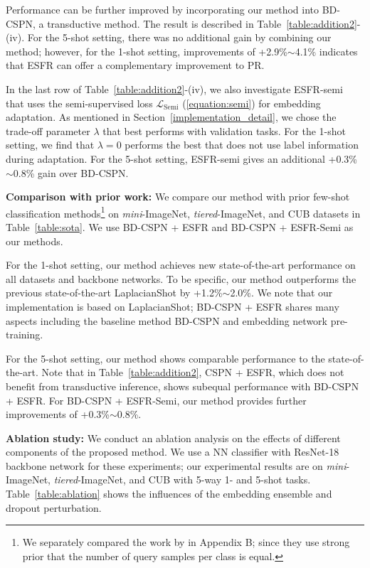 \documentclass{article}
\begin{document}
Performance can be further improved by incorporating our method into BD-CSPN, a transductive method. The result is described in Table~\ref{table:addition2}-(iv). For the 5-shot setting, there was no additional gain by combining our method; however, for the 1-shot setting, improvements of +2.9\%$\sim$4.1\% indicates that ESFR can offer a complementary improvement to PR.

In the last row of Table~\ref{table:addition2}-(iv), we also investigate ESFR-semi that uses the semi-supervised loss $\mathcal{L}_\text{Semi}$ (\ref{equation:semi}) for embedding adaptation. As mentioned in Section~\ref{implementation_detail}, we chose the trade-off parameter $\lambda$ that best performs with validation tasks. For the 1-shot setting, we find that $\lambda=0$ performs the best that does not use label information during adaptation. For the 5-shot setting, ESFR-semi gives an additional +0.3\%$\sim$0.8\% gain over BD-CSPN.

\textbf{Comparison with prior work:}
We compare our method with prior few-shot classification methods\footnote{We separately compared the work by \cite{TIM} in Appendix B; since they use strong prior that the number of query samples per class is equal.} on \textit{mini}-ImageNet, \textit{tiered}-ImageNet, and CUB datasets in Table~\ref{table:sota}. We use BD-CSPN + ESFR and BD-CSPN + ESFR-Semi as our methods.

For the 1-shot setting, our method achieves new state-of-the-art performance on all datasets and backbone networks. To be specific, our method outperforms the previous state-of-the-art LaplacianShot \cite{LaplacianShot} by +1.2\%$\sim$2.0\%. We note that our implementation is based on LaplacianShot; BD-CSPN + ESFR shares many aspects including the baseline method BD-CSPN and embedding network pre-training.

For the 5-shot setting, our method shows comparable performance to the state-of-the-art. Note that in Table~\ref{table:addition2}, CSPN + ESFR, which does not benefit from transductive inference, shows subequal performance with  BD-CSPN + ESFR. For BD-CSPN + ESFR-Semi, our method provides further improvements of +0.3\%$\sim$0.8\%.

\textbf{Ablation study:}
We conduct an ablation analysis on the effects of different components of the proposed method. We use a NN classifier with ResNet-18 backbone network for these experiments; our experimental results are on \textit{mini}-ImageNet, \textit{tiered}-ImageNet, and CUB with 5-way 1- and 5-shot tasks. Table~\ref{table:ablation} shows the influences of the embedding ensemble and dropout perturbation.
\end{document}
